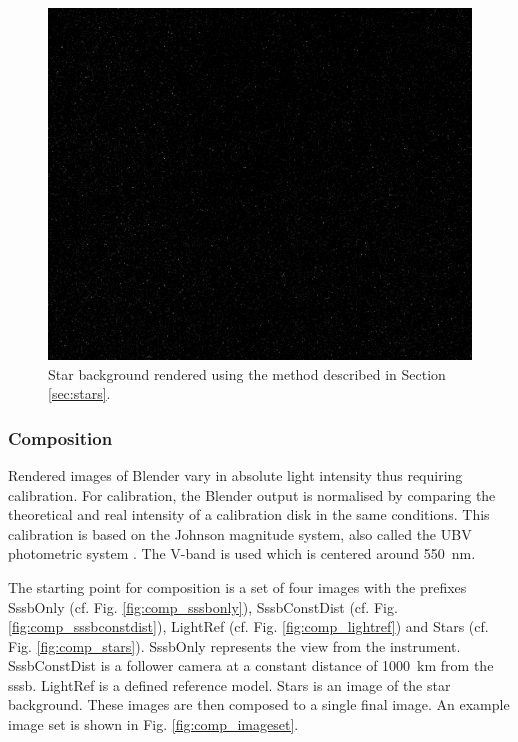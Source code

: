 \begin{figure}[htpb]
    \centering
    \includegraphics[width=\textwidth]{doc/thesis/0_figures/star_rendering/Stars_2017-08-15T115856-171000.png}
    \caption{Star background rendered using the method described in Section \ref{sec:stars}.}
    \label{fig:star_rendering}
\end{figure}


\subsubsection{Composition} \label{sec:composition}
Rendered images of Blender vary in absolute light intensity thus requiring calibration. For calibration, the Blender output is normalised by comparing the theoretical and real intensity of a calibration disk in the same conditions. This calibration is based on the Johnson magnitude system, also called the UBV photometric system \cite{bessel1979ubvri}. The V-band is used which is centered around \SI{550}{\nano\meter}.

The starting point for composition is a set of four images with the prefixes SssbOnly (cf. Fig. \ref{fig:comp_sssbonly}), SssbConstDist (cf. Fig. \ref{fig:comp_sssbconstdist}), LightRef (cf. Fig. \ref{fig:comp_lightref}) and Stars (cf. Fig. \ref{fig:comp_stars}). SssbOnly represents the view from the instrument. SssbConstDist is a follower camera at a constant distance of \SI{1000}{\kilo\meter} from the \gls{sssb}. LightRef is a defined reference model. Stars is an image of the star background. These images are then composed to a single final image. An example image set is shown in Fig. \ref{fig:comp_imageset}.

